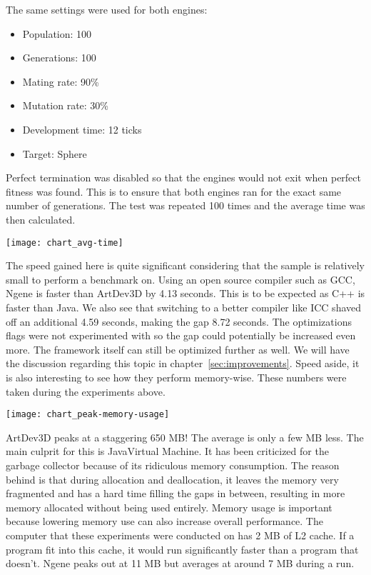 The same settings were used for both engines:

\begin{itemize}
	\itemsep=-2pt
	\item Population: 100
	\item Generations: 100
	\item Mating rate: 90\%
	\item Mutation rate: 30\%
	\item Development time: 12 ticks
	\item Target: Sphere
\end{itemize}

Perfect termination was disabled so that the engines would not exit when perfect fitness was found. This is to ensure that both engines ran for the exact same number of generations. The test was repeated 100 times and the average time was then calculated.

\begin{center}\texttt{[image: chart\_avg-time]}\end{center}

The speed gained here is quite significant considering that the sample is relatively small to perform a benchmark on. Using an open source compiler such as GCC, Ngene is faster than ArtDev3D by 4.13 seconds. This is to be expected as C++ is faster than Java. We also see that switching to a better compiler like ICC shaved off an additional 4.59 seconds, making the gap 8.72 seconds. The optimizations flags were not experimented with so the gap could potentially be increased even more. The framework itself can still be optimized further as well. We will have the discussion regarding this topic in chapter~\ref{sec:improvements}. Speed aside, it is also interesting to see how they perform memory-wise. These numbers were taken during the experiments above.

\begin{center}\texttt{[image: chart\_peak-memory-usage]}\end{center}

ArtDev3D peaks at a staggering 650 MB! The average is only a few MB less. The main culprit for this is Java\texttrademark Virtual Machine. It has been criticized\cite{maio2008} for the garbage collector because of its ridiculous memory consumption. The reason behind is that during allocation and deallocation, it leaves the memory very fragmented and has a hard time filling the gaps in between, resulting in more memory allocated without being used entirely. Memory usage is important because lowering memory use can also increase overall performance. The computer that these experiments were conducted on has 2 MB of L2 cache. If a program fit into this cache, it would run significantly faster than a program that doesn't. Ngene peaks out at 11 MB but averages at around 7 MB during a run.
